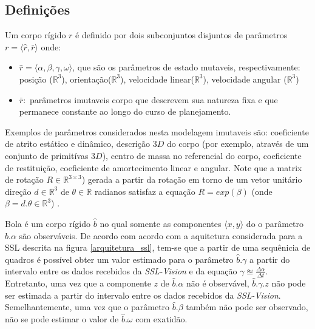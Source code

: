\subsection{Definições}

\begin{defi}
  Um corpo rígido $r$ é definido por dois subconjuntos disjuntos
  de parâmetros $r= \langle \hat{r}, \bar{r} \rangle$ onde:
  \begin{itemize}
    \item $\hat{r} = \langle \alpha, \beta, \gamma, \omega \rangle$,
    que são os parâmetros de estado mutaveis, respectivamente:
    posição ($\mathbb{R} ^{3}$), orientação($\mathbb{R} ^{3}$),
    velocidade linear($\mathbb{R} ^{3}$), velocidade angular
    ($\mathbb{R} ^{3}$)
    
    \item $\bar{r} :$ parâmetros imutaveis corpo que descrevem sua
    natureza fixa e que permanece constante ao longo do curso de 
    planejamento.
  \end{itemize}
  
  Exemplos de parâmetros considerados nesta modelagem imutaveis são:
  coeficiente de atrito estático e dinâmico, descrição $3D$ do corpo
  (por exemplo, através de um conjunto de primitívas $3D$), centro de
  massa no referencial do corpo, coeficiente de restituição,
  coeficiente de amortecimento linear e angular. Note que a matrix de
  rotação $R\in\mathbb{R}^{3\times 3}$) gerada a partir da rotação
  em torno de um vetor unitário direção $d\in\mathbb{R}^{3}$  de
  $\theta \in \mathbb{R}$ radianos satisfaz a equação
  $R = exp\left( \beta \right)$ (onde $\beta = d. \theta \in \mathbb{R} ^{3}$)
  \cite{math2robotics}.
\end{defi}

\begin{defi}[Bola]\label{def:bola}
  Bola é um corpo rígido $\hat{b}$ no qual somente as componentes 
  $\langle x,y \rangle$ do o parâmetro $\hat{b}.\alpha$ são
  observáveis. De acordo com acordo com a
  aquitetura considerada para a SSL descrita na figura
  \ref{arquitetura_ssl}, tem-se que a partir de uma sequênicia
  de quadros é possível obter um valor estimado para o parâmetro
  $\hat{b}.\gamma$ a partir do intervalo entre os dados recebidos
  da \textit{SSL-Vision} e da equação $ \gamma \approxeq 
  \frac{\Delta \alpha}{\Delta t} $. Entretanto, uma vez que a componente
  $z$ de $\hat{b}.\alpha$ não é observável, $\hat{b}.\gamma.z$ 
  não pode ser estimada a partir do intervalo entre os dados recebidos
  da \textit{SSL-Vision}. Semelhantemente,  uma vez que o
  parâmetro $\hat{b}.\beta$ também não pode ser observado,
  não se pode estimar o valor de $\hat{b}.\omega$ com exatidão.
\end{defi}

